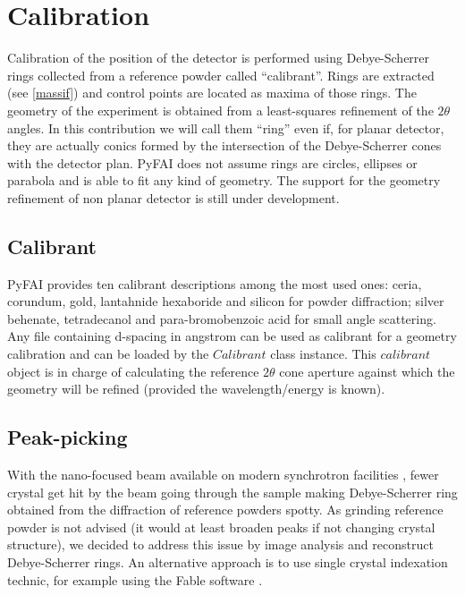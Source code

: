 \documentclass[preprint]{iucr}
\begin{document}
\section{Calibration}
Calibration of the position of the detector is performed using Debye-Scherrer
rings collected from a reference powder called ``calibrant''.
Rings are extracted (see \ref{massif}) and control points are located as maxima
of those rings.
The geometry of the experiment is obtained from a least-squares refinement of
the $2\theta$ angles.
In this contribution we will call them ``ring'' even if, for planar detector,
they are actually conics formed by the intersection of the Debye-Scherrer cones
with the detector plan. 
PyFAI does not assume rings are circles, ellipses or parabola and is able to fit
any kind of geometry. The support for the geometry refinement of non planar
detector is still under development.

\subsection{Calibrant}
PyFAI provides ten calibrant descriptions among the most used ones: ceria,
corundum, gold, lantahnide hexaboride and silicon for powder diffraction; silver behenate,
tetradecanol and para-bromobenzoic acid for small angle scattering.
Any file containing d-spacing in angstrom can be used as calibrant for a
geometry calibration and can be loaded by the $Calibrant$ class instance.
This $calibrant$ object is in charge of
calculating the reference $2\theta$ cone aperture 
against which the geometry will be refined (provided the wavelength/energy is
known).

\subsection{Peak-picking}
With the nano-focused beam available on modern synchrotron facilities
\cite{id13}, fewer crystal get hit by the beam going through the
sample making Debye-Scherrer ring obtained from the diffraction of reference
powders spotty.
As grinding reference powder is not advised (it would at least broaden peaks if
not changing crystal structure), we decided to address this issue by image analysis 
and reconstruct Debye-Scherrer rings.
An alternative approach is to use single crystal indexation technic, for
example using the Fable software \cite{bonnin}.
\end{document}
